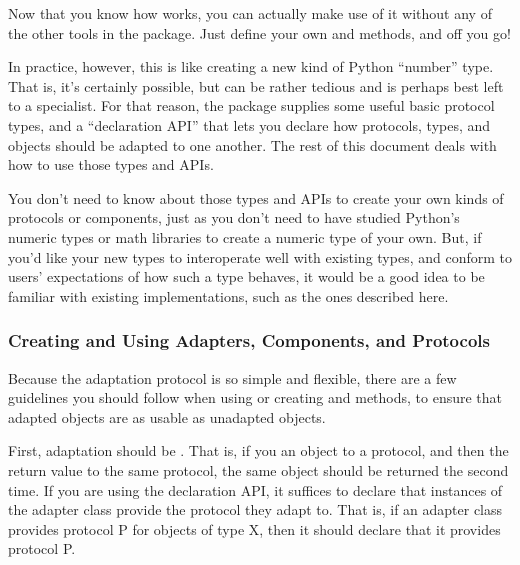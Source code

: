 Now that you know how  works, you can actually make use of it
without any of the other tools in the  package.  Just define
your own  and  methods, and off
you go!






In practice, however, this is like creating a new kind of Python ``number''
type.  That is, it's certainly possible, but can be rather tedious and is
perhaps best left to a specialist.  For that reason, the 
package supplies some useful basic protocol types, and a ``declaration API''
that lets you declare how protocols, types, and objects should be adapted to
one another.  The rest of this document deals with how to use those types and
APIs.

You don't need to know about those types and APIs to create your own kinds of
protocols or components, just as you don't need to have studied Python's
numeric types or math libraries to create a numeric type of your own.  But,
if you'd like your new types to interoperate well with existing types, and
conform to users' expectations of how such a type behaves, it would be a good
idea to be familiar with existing implementations, such as the ones described
here.


























\subsubsection{Creating and Using Adapters, Components, and Protocols}

Because the adaptation protocol is so simple and flexible, there are a few
guidelines you should follow when using  or creating
 and  methods, to ensure that adapted
objects are as usable as unadapted objects.

First, adaptation should be .  That is, if you
 an object to a protocol, and then  the
return value to the same protocol, the same object should be returned the
second time.  If you are using the  declaration API, it
suffices to declare that instances of the adapter class provide the protocol
they adapt to.  That is, if an adapter class provides protocol P for objects
of type X, then it should declare that it provides protocol P.

